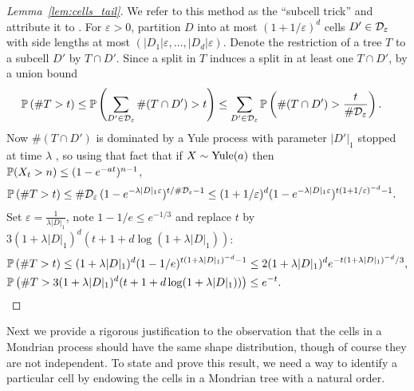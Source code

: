 \begin{proof}[Lemma~\ref{lem:cells_tail}]

  We refer to this method as the ``subcell trick''
  and attribute it to \citet{mourtada2017universal}.
  For $\varepsilon > 0$, partition $D$ into
  at most $(1 + 1/\varepsilon)^d$ cells $D' \in \cD_\varepsilon$
  with side lengths at most $(|D_1| \varepsilon, \ldots, |D_d| \varepsilon)$.
  Denote the restriction of a tree $T$ to a subcell $D'$ by $T \cap D'$.
  Since a split in $T$ induces a split in at least one $T \cap D'$,
  by a union bound
  \begin{align*}
    \P\left(\# T > t \right)
    &\leq
    \P\left(\sum_{D' \in \cD_\varepsilon}
    \# (T \cap D') > t \right)
    \leq
    \sum_{D' \in \cD_\varepsilon}
    \P\left(
      \# (T \cap D') >
      \frac{t}{\# \cD_\varepsilon}
    \right).
  \end{align*}
  Now $\# (T \cap D')$ is dominated by a Yule process
  with parameter $|D'|_1$ stopped at time $\lambda$
  \citep[proof of Lemma~2]{mourtada2017universal},
  so using that fact that if
  $X \sim \Yule(a)$
  then $\P(X_t > n) \leq (1-e^{-at})^{n-1}$,
  \begin{align*}
    \P\left(\# T > t \right)
    &\leq
    \# \cD_\varepsilon \,
    (1 - e^{-\lambda |D|_1 \varepsilon})^{t / \# \cD_\varepsilon - 1}
    \leq
    (1 + 1/\varepsilon)^d
    (1 - e^{-\lambda |D|_1 \varepsilon})^{t (1 + 1/\varepsilon)^{-d} - 1}.
  \end{align*}
  Set $\varepsilon = \frac{1}{\lambda |D|_1}$,
  note $1-1/e \leq e^{-1/3}$
  and replace $t$ by
  $3 (1 + \lambda |D|_1)^d
  (t + 1 + d \log(1 + \lambda |D|_1))$:
  \begin{align*}
    &\P\left(\# T > t \right)
    \leq
    (1 + \lambda |D|_1)^d
    (1 - 1/e)^{t (1 + \lambda |D|_1)^{-d} - 1}
    \leq
    2 (1 + \lambda |D|_1)^d
    e^{-t (1 + \lambda |D|_1)^{-d} / 3}, \\
    &\P\left(\# T >
      3
      (1 + \lambda |D|_1)^d
      (t + 1 + d \log(1 + \lambda |D|_1))
    \right)
    \leq
    e^{-t}.
  \end{align*}
\end{proof}

Next we provide a rigorous justification to the observation that the cells
in a Mondrian process should have the same shape distribution, though
of course they are not independent. To state and prove this result,
we need a way to identify a particular cell by endowing the
cells in a Mondrian tree with a natural order.

